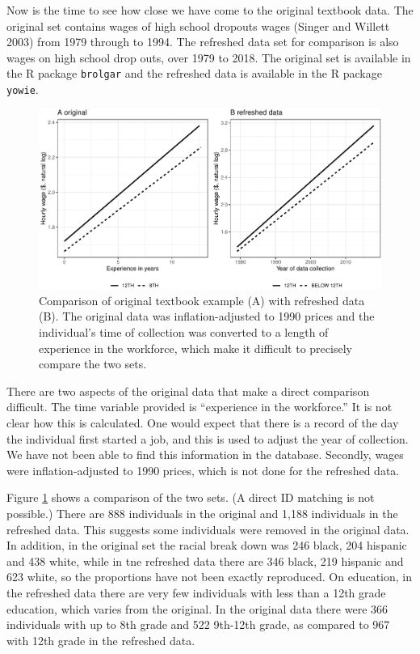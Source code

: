 \documentclass[12pt]{article}
\begin{document}
Now is the time to see how close we have come to the original textbook data. The original set contains wages of high school dropouts wages (Singer and Willett 2003) from 1979 through to 1994. The refreshed data set for comparison is also wages on high school drop outs, over 1979 to 2018. The original set is available in the R package \texttt{brolgar} and the refreshed data is available in the R package \texttt{yowie}.

\begin{figure}

{\centering \includegraphics[width=1\linewidth]{figures/plotting-sw-do-1} 

}

\caption{Comparison of original textbook example (A) with refreshed data (B). The original data was inflation-adjusted to 1990 prices and the individual's time of collection was converted to a length of experience in the workforce, which make it difficult to precisely compare the two sets.}\label{fig:plotting-sw-do}
\end{figure}

There are two aspects of the original data that make a direct comparison difficult. The time variable provided is ``experience in the workforce.'' It is not clear how this is calculated. One would expect that there is a record of the day the individual first started a job, and this is used to adjust the year of collection. We have not been able to find this information in the database. Secondly, wages were inflation-adjusted to 1990 prices, which is not done for the refreshed data.

Figure \ref{fig:plotting-sw-do} shows a comparison of the two sets. (A direct ID matching is not possible.) There are 888 individuals in the original and 1,188 individuals in the refreshed data. This suggests some individuals were removed in the original data.
In addition, in the original set the racial break down was 246 black, 204 hispanic and 438 white, while in tne refreshed data there are 346 black, 219 hispanic and 623 white, so the proportions have not been exactly reproduced. On education, in the refreshed data there are very few individuals with less than a 12th grade education, which varies from the original. In the original data there were 366 individuals with up to 8th grade and 522 9th-12th grade, as compared to 967 with 12th grade in the refreshed data.
\end{document}
